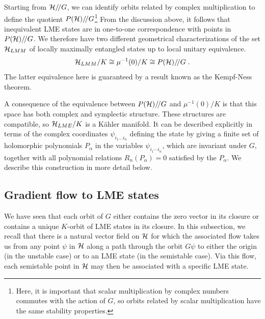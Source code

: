 \documentclass[12pt]{article}
\theoremstyle{definition}
\newcommand{\be}{\begin{equation}}
\newcommand{\ee}{\end{equation}}
\newcommand{\GITquot}{/\!/}
\begin{document}
Starting from ${\cal H}\GITquot G$, we can identify orbits related by complex multiplication to define the quotient $P({\cal H})\GITquot G$\footnote{Here, it is important that scalar multiplication by complex numbers commutes with the action of $G$, so orbits related by scalar multiplication have the same stability properties.} From the discussion above, it follows that inequivalent LME states are in one-to-one correspondence with points in $P({\cal H})\GITquot G$. We therefore have two different geometrical characterizations of the set ${\cal H}_{LMM}$ of locally maximally entangled states up to local unitary equivalence.
\be
{\cal H}_{LMM}/K \cong \mu^{-1}(0)/K \cong P({\cal H})\GITquot G \; .
\ee
The latter equivalence here is guaranteed by a result known as the Kempf-Ness theorem.

A consequence of the equivalence between $P({\cal H})\GITquot G$ and
$\mu^{-1}(0)/K$ is that this space has both complex and symplectic
structure. These structures are compatible, so ${\cal H}_{LME}/K$ is a
K\"ahler manifold. It can be described explicitly in terms of the
complex coordinates $\psi_{i_1 \dots i_n}$ defining the state by
giving a finite set of holomorphic polynomials $P_{\alpha }$ in the
variables $\psi_{i_{1}\dotsb i_{n}}$, which are invariant under $G$,
together with all polynomial relations $R_n(P_\alpha ) = 0$ satisfied
by the $P_{\alpha }$. We describe this construction in more detail below.

\subsection{Gradient flow to LME states}

We have seen that each orbit of $G$ either contains the zero vector in its closure or contains a unique $K$-orbit of LME states in its closure. In this subsection, we recall that there is a natural vector field on ${\cal H}$ for which the associated flow takes us from any point $\psi$ in ${\cal H}$ along a path through the orbit $G \psi$ to either the origin (in the unstable case) or to an LME state (in the semistable case). Via this flow, each semistable point in ${\cal H}$ may then be associated with a specific LME state.
\end{document}
